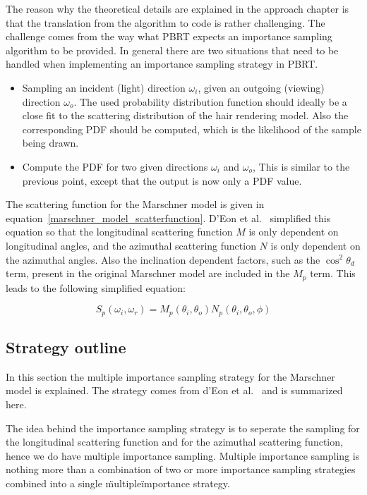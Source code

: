 \documentclass[11pt,a4paper]{report}
\begin{document}
The reason why the theoretical details are explained in the approach chapter is that the translation from the algorithm to code is rather challenging. The challenge comes from the way what PBRT expects an importance sampling algorithm to be provided. In general there are two situations that need to be handled when implementing an importance sampling strategy in PBRT.

\begin{itemize}
    \item Sampling an incident (light) direction $\omega_i$, given an outgoing (viewing) direction $\omega_o$. The used probability distribution function should ideally be a close fit to the scattering distribution of the hair rendering model. Also the corresponding PDF should be computed, which is the likelihood of the sample being drawn.

    \item Compute the PDF for two given directions $\omega_i$ and $\omega_o$, This is similar to the previous point, except that the output is now only a PDF value.
\end{itemize}

The scattering function for the Marschner model is given in equation~\ref{marschner_model_scatterfunction}. D'Eon et al.~\cite{eon2011} simplified this equation so that the longitudinal scattering function $M$ is only dependent on longitudinal angles, and the azimuthal scattering function $N$ is only dependent on the azimuthal angles. Also the inclination dependent factors, such as the $\cos^2 \theta_d$ term, present in the original Marschner model are included in the $M_p$ term. This leads to the following simplified equation:

\begin{equation}
    \label{eq_model_S}
    S_p(\omega_i, \omega_r) = M_p(\theta_i, \theta_o) N_p(\theta_i, \theta_o, \phi)
\end{equation}

\subsection{Strategy outline}

In this section the multiple importance sampling strategy for the Marschner model is explained. The strategy comes from d'Eon et al.~\cite{eon2013} and is summarized here.

The idea behind the importance sampling strategy is to seperate the sampling for the longitudinal scattering function and for the azimuthal scattering function, hence we do have multiple importance sampling. Multiple importance sampling is nothing more than a combination of two or more importance sampling strategies combined into a single \"multiple\" importance strategy.
\end{document}

